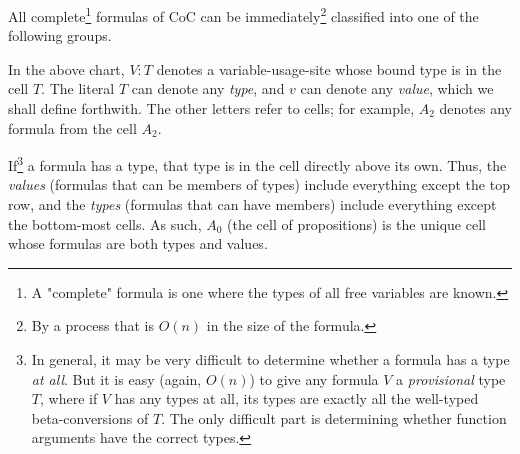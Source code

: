 \documentclass{article}
\begin{document}
  All complete\footnote{A "complete" formula is one where the types of all free variables are known.} formulas of CoC can be immediately\footnote{By a process that is $O(n)$ in the size of the formula.} classified into one of the following groups.

  \vspace{0.5cm}

  \noindent{}

  \vspace{0.5cm}

  In the above chart, $V:T$ denotes a variable-usage-site whose bound type is in the cell $T$. The literal $T$ can denote any \emph{type}, and $v$ can denote any \emph{value}, which we shall define forthwith. The other letters refer to cells; for example, $A_2$ denotes any formula from the cell $A_2$.

  If\footnote{In general, it may be very difficult to determine whether a formula has a type \emph{at all}. But it is easy (again, $O(n)$) to give any formula $V$ a \emph{provisional} type $T$, where if $V$ has any types at all, its types are exactly all the well-typed beta-conversions of $T$. The only difficult part is determining whether function arguments have the correct types.} a formula has a type, that type is in the cell directly above its own. Thus, the \emph{values} (formulas that can be members of types) include everything except the top row, and the \emph{types} (formulas that can have members) include everything except the bottom-most cells. As such, $A_0$ (the cell of propositions) is the unique cell whose formulas are both types and values.
\end{document}
